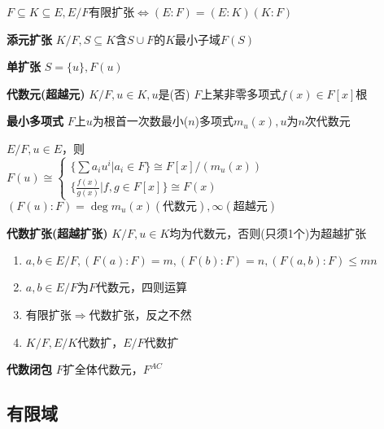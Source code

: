\documentclass[b4paper, 10pt]{ctexart}
\newcommand*{\impl}{\Rightarrow}
\renewcommand*{\iff}{\Leftrightarrow}
\renewcommand*{\leq}{\leqslant}
\newcommand*{\set}[1]{\{#1\}}
\begin{document}
\begin{multicols}{3}
    \begin{theorem}[链式法则]
        $F\subseteq K \subseteq E, E/F$有限扩张$\iff (E:F)=(E:K)(K:F)$
    \end{theorem}

    \textbf{添元扩张} $K/F, S \!\!\subseteq\!\! K$含$S \!\cup\! F$的$K$最小子域$F(S)$

    \textbf{单扩张} $S = \set{u}, F(u)$

    \textbf{代数元(超越元)} $K/F, u\in K, u$是(否) $F$上某非零多项式$f(x)\in F[x]$根

    \textbf{最小多项式} $F$上$u$为根首一次数最小($n$)多项式$m_u(x), u$为$n$次代数元

    \begin{theorem}[单扩张定理]
        $E/F, u \in E$，则\\
        $F(u) \cong \begin{cases}
                \{ \sum a_i u^i | a_i \in F \} \cong F[x]/(m_u(x)) \\
                \{ \frac{f(x)}{g(x)} | f,g \in F[x] \} \cong F(x)
            \end{cases}$\\
        $(F(u)\!:\!F) = \deg m_u(x) (\text{代数元}), \infty (\text{超越元})$
    \end{theorem}

    \textbf{代数扩张(超越扩张)} $K/F, u \in K$均为代数元，否则(只须1个)为超越扩张

    \begin{theorem}[代数扩张性质]
        \hfil

        \begin{enumerate}
            \item $a, b \in E/F, (F(a)\!:\!F) \! = \! m, (F(b)\!:\!F) \! = \! n, (F(a,b)\!:\!F) \!\leq\! mn$
            \item $a,b \!\in\! E/F$为$F$代数元，四则运算\checkmark
            \item 有限扩张$\impl$代数扩张，反之不然
            \item $K/F, E/K$代数扩，$E/F$代数扩
        \end{enumerate}
    \end{theorem}

    \textbf{代数闭包} $F$扩全体代数元，$F^{AC}$

    \subsection{有限域}


\end{multicols}
\end{document}
